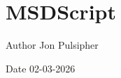 \chapter{MSDScript }
\hypertarget{index}{}\label{index}
\begin{DoxyAuthor}{Author}
Jon Pulsipher 
\end{DoxyAuthor}
\begin{DoxyDate}{Date}
02-\/03-\/2026 
\end{DoxyDate}
